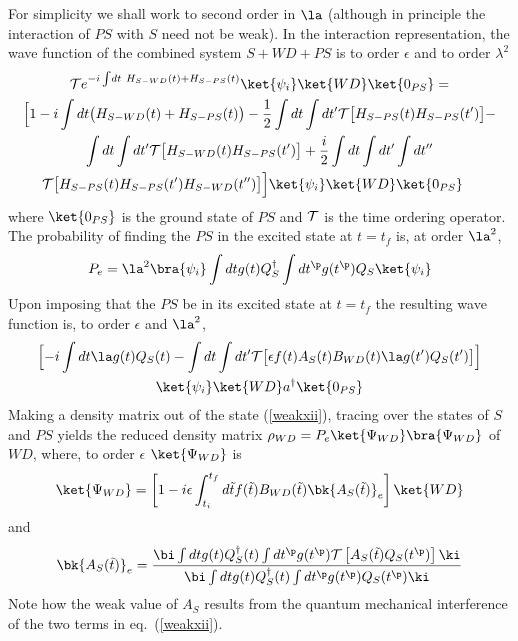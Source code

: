 \documentclass[12pt]{article}
\begin{document}
For simplicity we shall work to second order in $\la$ (although in principle
the interaction of $PS$ with $S$ need not be weak).
In the interaction
representation, the wave function of the combined system $S+WD+PS$ is
to order $\epsilon$ and to order $\lambda^2$
\begin{multline}
{\cal T} e^{-i \int\! dt \ H_{S-WD}(t) + H_{S-PS}(t)}
\ket{\psi_i}\ket{WD}\ket{0_{PS}}=\\
 \Bigl[
1 -i \int dt \bigl( H_{S-WD}(t) + H_{S-PS}(t) \bigr)
-{1 \over 2}
\int dt \int dt^\prime
{\cal T}\bigl[ H_{S-PS}(t)  H_{S-PS}(t^\prime) \bigr]
-\\
\int dt \int dt^\prime
{\cal T}\bigl[ H_{S-WD}(t)  H_{S-PS}(t^\prime) \bigr]
+{i \over 2}
\int dt \int dt^\prime\int dt^{\prime\prime}\\
{\cal T}\bigl[ H_{S-PS}(t)  H_{S-PS}(t^\prime)
 H_{S-WD}(t^{\prime\prime})
\bigr]
\Bigr]
\ket{\psi_i}\ket{WD}\ket{0_{PS}}\quad
\label{weakxi}
\end{multline}
where $\ket{0_{PS}}$ is the ground state of $PS$ and ${\cal T}$ is
the time ordering operator.
The probability of finding the $PS$ in the excited state at $t=t_f$ is,
at order $\la^2$,
\begin{equation}
P_{e}
= \la^2  \bra{\psi_i} \int dt g(t) Q^\dagger_S
\int dt^\p g(t^\p) Q_S \ket{\psi_i}
\end{equation}
Upon imposing that the
$PS$ be in its excited state at $t=t_f$ the
resulting
wave function  is, to order $\epsilon$ and $\la^2$,
\begin{multline}
\Bigl [
-i \int dt \la g(t) Q_S(t) -
\int dt \int dt^\prime
{\cal T}
\bigl[\epsilon f(t) A_S(t) B_{WD}(t) \la g(t^\prime) Q_S(t^\prime)
\bigr]
\Bigr]\\
\ket{\psi_i}\ket{WD}a^\dagger\ket{0_{PS}}
\label{weakxii}\end{multline}
Making a density matrix out of the state (\ref{weakxii}),
tracing over the states of $S$ and $PS$
yields the reduced density matrix $\rho_{WD} =
P_{e}\ket{\Psi_{WD}}\bra{\Psi_{WD}}$ of $WD$, where, to order $\epsilon$
$\ket{\Psi_{WD}}$ is
\begin{equation}
\ket{\Psi_{WD}}=\left[
1 - i \epsilon \int_{t_i}^{t_f} d\tilde t f(\tilde t) B_{WD}(\tilde t)
\bk{A_{S}(\tilde t)}_{e} \right] \ket{WD}
\label{weakxiii}
\end{equation}
and
\begin{equation}
\bk{A_{S}(\tilde t)}_{e} =
{ \bi \int dt g(t) Q_S^\dagger (t)  \int dt^\p
g(t^\p) {\cal T } \left[ A_S(\tilde t) Q_S(t^\p) \right]
\ki \over \bi \int dt g(t) Q_S^\dagger (t) \int
dt^\p g(t^\p) Q_S(t^\p) \ki} \label{weakxiv} \end{equation}
Note how the weak value of $A_S$ results from the quantum mechanical
interference of the two terms in eq.~(\ref{weakxii}).
\end{document}
